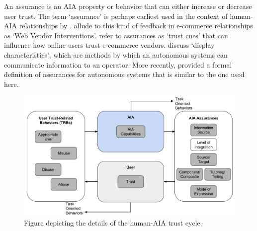 An assurance is an AIA property or behavior that can either increase or decrease user trust. The term `assurance' is perhaps earliest used in the context of human-AIA relationships by \citet{Sheridan1984-kx}. \citet{McKnight2001-fa} allude to this kind of feedback in e-commerce relationships as `Web Vendor Interventions'. \citet{Corritore2003-gx} refer to assurances as `trust cues' that can influence how online users trust e-commerce vendors. \citet{Lee2004-pv} discuss `display characteristics', which are methods by which an autonomous systems can communicate information to an operator. More recently, \citet{Lillard2015-yg} provided a formal definition of assurances for autonomous systems that is similar to the one used here. 

\begin{figure}[t]%
    \centering
    \includegraphics[width=0.6\linewidth]{Figures/RefinedTrust_one_way.pdf}
    \caption{Figure depicting the details of the human-AIA trust cycle.}
    \label{fig:refined_trust}
    \vspace{-0.2 in}
\end{figure}

